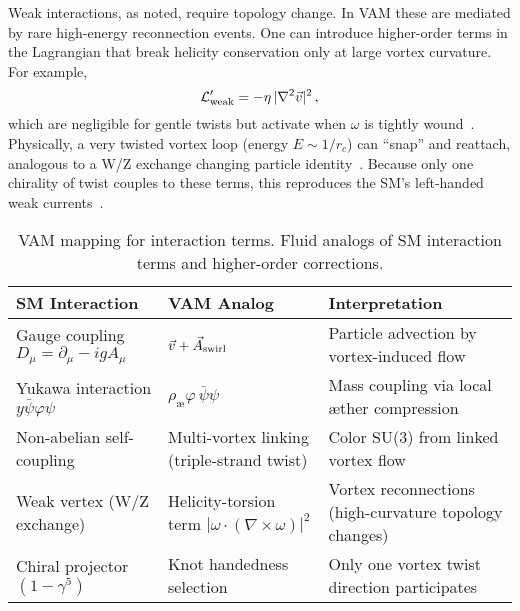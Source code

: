 \documentclass[a4paper,12pt]{article}
\begin{document}
Weak interactions, as noted, require topology change. In VAM these are mediated by rare high-energy reconnection events. One can introduce higher-order terms in the Lagrangian that break helicity conservation only at large vortex curvature. For example,
\begin{equation}
    \mathcal{L}'_{\rm weak} = -\eta\,|\nabla^2\vec{v}|^2\,,
\end{equation}
which are negligible for gentle twists but activate when $\omega$ is tightly wound~\cite{vam-weak}. Physically, a very twisted vortex loop (energy $E\sim 1/r_c$) can ``snap'' and reattach, analogous to a W/Z exchange changing particle identity~\cite{vam-weak}. Because only one chirality of twist couples to these terms, this reproduces the SM's left-handed weak currents~\cite{vam-weak}.

\begin{table}[H]
    \centering
    \begin{tabular}{lll}
        \toprule
        \textbf{SM Interaction} & \textbf{VAM Analog} & \textbf{Interpretation} \\
        \midrule
        Gauge coupling $D_\mu = \partial_\mu - igA_\mu$ & $\vec{v} + \vec{A}_{\rm swirl}$ & Particle advection by vortex-induced flow \\
        Yukawa interaction $y\bar{\psi}\varphi\psi$ & $\rho_{æ}\varphi\,\bar{\psi}\psi$ & Mass coupling via local æther compression \\
        Non-abelian self-coupling & Multi-vortex linking (triple-strand twist) & Color SU(3) from linked vortex flow \\
        Weak vertex (W/Z exchange) & Helicity-torsion term $|\omega\cdot(\nabla\times\omega)|^2$ & Vortex reconnections (high-curvature topology changes) \\
        Chiral projector $(1-\gamma^5)$ & Knot handedness selection & Only one vortex twist direction participates \\
        \bottomrule
    \end{tabular}
    \caption{VAM mapping for interaction terms. Fluid analogs of SM interaction terms and higher-order corrections.}
    \label{tab:interaction-map}
\end{table}
\end{document}
